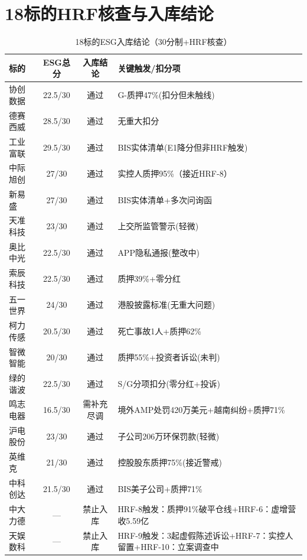 \section{18标的HRF核查与入库结论}

\begin{table}[H]
\centering\scriptsize
\renewcommand{\arraystretch}{1.1}
\begin{tabularx}{\textwidth}{l c c X}
\toprule
\textbf{标的} & \textbf{ESG总分} & \textbf{入库结论} & \textbf{关键触发/扣分项} \\
\midrule
协创数据 & 22.5/30 & \textcolor{riskgreen}{通过} & G-质押47\%(扣分但未触线) \\
德赛西威 & 28.5/30 & \textcolor{riskgreen}{通过} & 无重大扣分 \\
工业富联 & 29.5/30 & \textcolor{riskgreen}{通过} & \textcolor{riskamber}{BIS实体清单(E1降分但非HRF触发)} \\
中际旭创 & 27/30 & \textcolor{riskgreen}{通过} & \textcolor{riskamber}{实控人质押95\%（接近HRF-8）} \\
新易盛 & 27/30 & \textcolor{riskgreen}{通过} & \textcolor{riskamber}{BIS实体清单+多次问询函} \\
天准科技 & 23/30 & \textcolor{riskgreen}{通过} & 上交所监管警示(轻微) \\
奥比中光 & 22.5/30 & \textcolor{riskgreen}{通过} & APP隐私通报(整改中) \\
索辰科技 & 22.5/30 & \textcolor{riskgreen}{通过} & 质押39\%+零分红 \\
五一世界 & 24/30 & \textcolor{riskgreen}{通过} & 港股披露标准(无重大问题) \\
柯力传感 & 20.5/30 & \textcolor{riskgreen}{通过} & \textcolor{riskamber}{死亡事故1人+质押62\%} \\
智微智能 & 20/30 & \textcolor{riskgreen}{通过} & 质押55\%+投资者诉讼(未判) \\
绿的谐波 & 22.5/30 & \textcolor{riskgreen}{通过} & S/G分项扣分(零分红+投诉) \\
鸣志电器 & 16.5/30 & \textcolor{riskamber}{需补充尽调} & \textcolor{riskamber}{境外AMP处罚420万美元+越南纠纷+质押71\%} \\
沪电股份 & 23/30 & \textcolor{riskgreen}{通过} & 子公司206万环保罚款(轻微) \\
英维克 & 21/30 & \textcolor{riskgreen}{通过} & 控股股东质押75\%(接近警戒) \\
中科创达 & 21.5/30 & \textcolor{riskgreen}{通过} & BIS美子公司+质押71\% \\
\textcolor{riskred}{中大力德} & — & \textcolor{riskred}{禁止入库} & \textcolor{riskred}{HRF-8触发：质押91\%破平仓线+HRF-6：虚增营收5.59亿} \\
\textcolor{riskred}{天娱数科} & — & \textcolor{riskred}{禁止入库} & \textcolor{riskred}{HRF-9触发：3起虚假陈述诉讼+HRF-7：实控人留置+HRF-10：立案调查中} \\
\bottomrule
\end{tabularx}
\caption{18标的ESG入库结论（30分制+HRF核查）}
\end{table}

